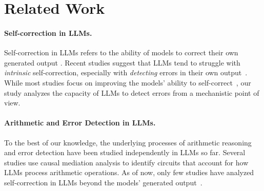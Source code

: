 \section{Related Work}
\label{sec:Related_Work}
\paragraph{Self-correction in LLMs.} Self-correction in LLMs refers to the ability of models to correct their own generated output \citep{kamoi2024correctionsurvey, huang2024cannotselfcorrect, madaan2023selfrefine}. Recent studies \citep{tyen2024errorlocation, kamoi2024evaluatingdetecting} suggest that LLMs tend to struggle with \textit{intrinsic} self-correction, especially with \emph{detecting} errors in their own output~\citep{huang2024cannotselfcorrect, tyen2024errorlocation, kamoi2024correctionsurvey}. While most studies focus on improving the models' ability to self-correct~\citep{kamoi2024correctionsurvey, madaan2023selfrefine, chen2024selfdebug, zhao2023verifyandedit, welleck2023learnselfcorrect}, our study analyzes the capacity of LLMs to detect errors from a mechanistic point of view.

\paragraph{Arithmetic and Error Detection in LLMs.} To the best of our knowledge, the underlying processes of arithmetic reasoning and error detection have been studied independently in LLMs so far. Several studies \citep{stolfo2023arithmetic, zhang2024arithmetic, nikankin2024bagofheuristics} use causal mediation analysis \citep{pearl2001effects} to identify circuits that account for how LLMs process arithmetic operations. As of now, only few studies have analyzed self-correction in LLMs beyond the models' generated output~\citep{DBLP:journals/corr/abs-2402-12563, liu2024moralselfcorrection}.